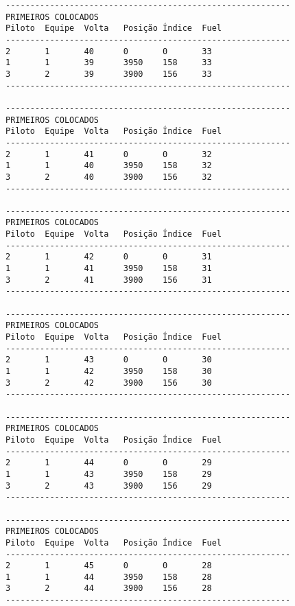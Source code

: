 \documentclass[12pt]{article}
\begin{document}
\begin{verbatim}
----------------------------------------------------------
PRIMEIROS COLOCADOS
Piloto  Equipe  Volta   Posição Índice  Fuel
----------------------------------------------------------
2       1       40      0       0       33
1       1       39      3950    158     33
3       2       39      3900    156     33
----------------------------------------------------------

----------------------------------------------------------
PRIMEIROS COLOCADOS
Piloto  Equipe  Volta   Posição Índice  Fuel
----------------------------------------------------------
2       1       41      0       0       32
1       1       40      3950    158     32
3       2       40      3900    156     32
----------------------------------------------------------

----------------------------------------------------------
PRIMEIROS COLOCADOS
Piloto  Equipe  Volta   Posição Índice  Fuel
----------------------------------------------------------
2       1       42      0       0       31
1       1       41      3950    158     31
3       2       41      3900    156     31
----------------------------------------------------------

----------------------------------------------------------
PRIMEIROS COLOCADOS
Piloto  Equipe  Volta   Posição Índice  Fuel
----------------------------------------------------------
2       1       43      0       0       30
1       1       42      3950    158     30
3       2       42      3900    156     30
----------------------------------------------------------

----------------------------------------------------------
PRIMEIROS COLOCADOS
Piloto  Equipe  Volta   Posição Índice  Fuel
----------------------------------------------------------
2       1       44      0       0       29
1       1       43      3950    158     29
3       2       43      3900    156     29
----------------------------------------------------------

----------------------------------------------------------
PRIMEIROS COLOCADOS
Piloto  Equipe  Volta   Posição Índice  Fuel
----------------------------------------------------------
2       1       45      0       0       28
1       1       44      3950    158     28
3       2       44      3900    156     28
----------------------------------------------------------


\end{verbatim}
\end{document}
